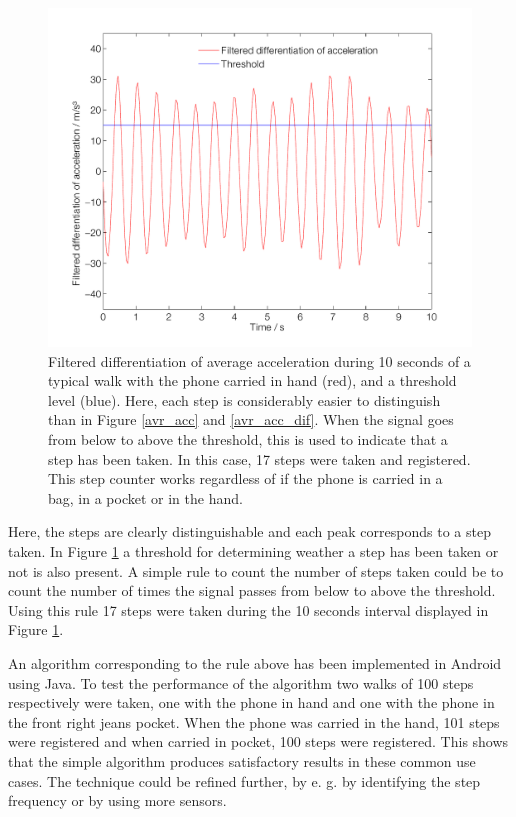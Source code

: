 \documentclass{LTHthesis}
\begin{document}
\begin{figure}[!hbt]

\includegraphics[width=1\textwidth ]{images/kinematic/avr_acc_dif_filt}
\caption{Filtered differentiation of average acceleration during 10 seconds of a typical walk with the phone carried in hand (red), and a threshold level (blue). Here, each step is considerably easier to distinguish than in Figure \ref{avr_acc} and \ref{avr_acc_dif}. When the signal goes from below to above the threshold, this is used to indicate that a step has been taken. In this case, 17 steps were taken and registered. This step counter works regardless of if the phone is carried in a bag, in a pocket or in the hand.}\label{avr_acc_dif_filt}
\end{figure}

Here, the steps are clearly distinguishable and each peak corresponds to a step taken. In Figure \ref{avr_acc_dif_filt} a threshold for determining weather a step has been taken or not is also present. A simple rule to count the number of steps taken could be to count the number of times the signal passes from below to above the threshold. Using this rule 17 steps were taken during the 10 seconds interval displayed in Figure \ref{avr_acc_dif_filt}.

An algorithm corresponding to the rule above has been implemented in Android using Java. To test the performance of the algorithm two walks of 100 steps respectively were taken, one with the phone in hand and one with the phone in the front right jeans pocket. When the phone was carried in the hand, 101 steps were registered and when carried in pocket, 
100 steps were registered. This shows that the simple algorithm produces satisfactory results in these common use cases.
The technique could be refined further, by e. g. by identifying the step frequency or by using more sensors. 
%
\end{document}
